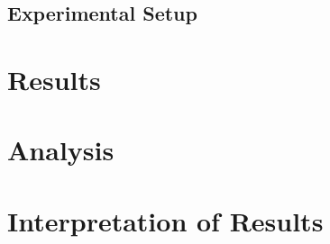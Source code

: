 \subsection{Experimental Setup}
\section{Results}
\section{Analysis}
\section{Interpretation of Results}